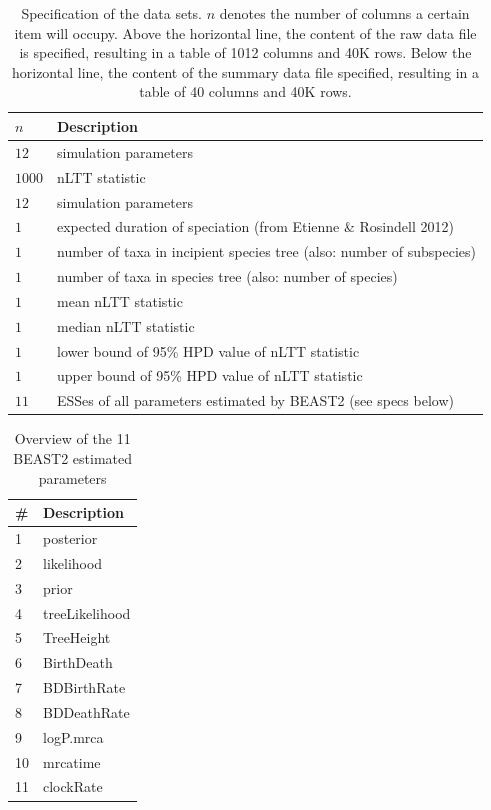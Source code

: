 \documentclass{article}
\begin{document}
\begin{table}
  \centering 
  \begin{tabular}{l l}
    \hline
    $n$ & Description \\
    \hline
    \hline
    $12$   & simulation parameters \\
    $1000$ & nLTT statistic \\
    \hline
    $12$ & simulation parameters \\
    $1$ & expected duration of speciation (from Etienne \& Rosindell 2012) \\
    $1$ & number of taxa in incipient species tree (also: number of subspecies) \\
    $1$ & number of taxa in species tree (also: number of species) \\
    $1$ & mean nLTT statistic \\
    $1$ & median nLTT statistic \\
    $1$ & lower bound of 95\% HPD value of nLTT statistic \\
    $1$ & upper bound of 95\% HPD value of nLTT statistic \\
    $11$ & ESSes of all parameters estimated by BEAST2 (see specs below) \\
    \hline
  \end{tabular}
  \caption{
    Specification of the data sets. $n$ denotes the number
    of columns a certain item will occupy. Above the horizontal line,
    the content of the raw data file is specified, resulting in a table of 
    1012 columns and 40K rows. Below the horizontal line,
    the content of the summary data file specified, resulting in a table of
    40 columns and 40K rows.
  }
  \label{table:raw_data_set_specs}
\end{table}

\begin{table}
  \centering 
  \begin{tabular}{l l}
    \hline
    \# & Description \\
    \hline
    \hline
    1 & posterior \\
    2 & likelihood \\
    3 & prior \\
    4 & treeLikelihood \\
    5 & TreeHeight \\
    6 & BirthDeath \\
    7 & BDBirthRate \\
    8 & BDDeathRate \\
    9 & logP.mrca \\
    10 & mrcatime \\
    11 & clockRate \\
    \hline
  \end{tabular}
  \caption{
    Overview of the 11 BEAST2 estimated parameters
  }
  \label{table:estimated_parameters}
\end{table}
\end{document}
